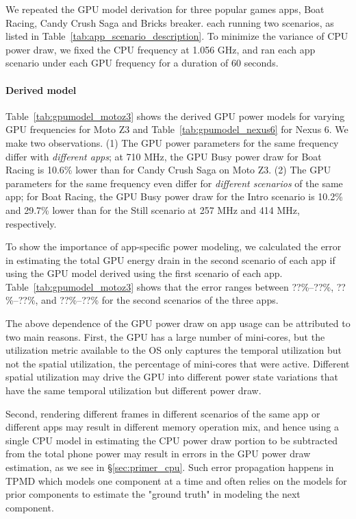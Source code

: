 
We repeated the GPU model derivation for three
popular games apps, Boat Racing, Candy Crush Saga and Bricks breaker.
each running two scenarios, as listed in Table~\ref{tab:app_scenario_description}.
To minimize the variance of CPU power draw, we fixed the CPU frequency at 1.056 GHz,
and ran each app scenario under each GPU frequency for a duration of 60 seconds.

\paragraph{Derived model}
Table~\ref{tab:gpumodel_motoz3} shows the derived GPU power models for varying GPU frequencies for Moto Z3 and Table~\ref{tab:gpumodel_nexus6} for Nexus 6.
We make two observations.
(1) The GPU power parameters for the same frequency differ with {\it different apps}; at 710 MHz, the GPU Busy power draw for Boat Racing is 10.6\% lower than for Candy Crush Saga on Moto Z3.
(2) The GPU parameters for the same frequency even differ for {\it different scenarios} 
of the same app; for Boat Racing, the GPU Busy power draw
for the Intro scenario is 10.2\% and 29.7\% lower than for the Still scenario
at 257 MHz and 414 MHz, respectively.

To show the importance of app-specific power modeling, we calculated the error
in estimating the total GPU energy drain in the second scenario of each app 
if using the GPU model derived using the first scenario of each app.
Table~\ref{tab:gpumodel_motoz3} shows that the error ranges between 
??\%--??\%, ??\%--??\%, and ??\%--??\% for the second scenarios of the three apps.


The above dependence of the GPU power draw on app usage can be attributed  to two main reasons.
First, the GPU has a large number of mini-cores, but the utilization metric available to the OS only captures the temporal utilization but not the spatial utilization, \ie the percentage of mini-cores that were active.
Different spatial utilization may drive the GPU into different power state variations that have the same temporal utilization but different power draw.

Second, rendering different frames in different scenarios of the same app or different apps may result in different memory operation mix, and hence using a single CPU model in estimating the CPU power draw portion to be subtracted from the total phone power 
may result in errors in the GPU power draw  estimation, as we see in \S\ref{sec:primer_cpu}. 
Such error propagation happens in TPMD which models one component at a time
and often relies on the models for prior components to estimate the "ground truth" in modeling  the next component. 